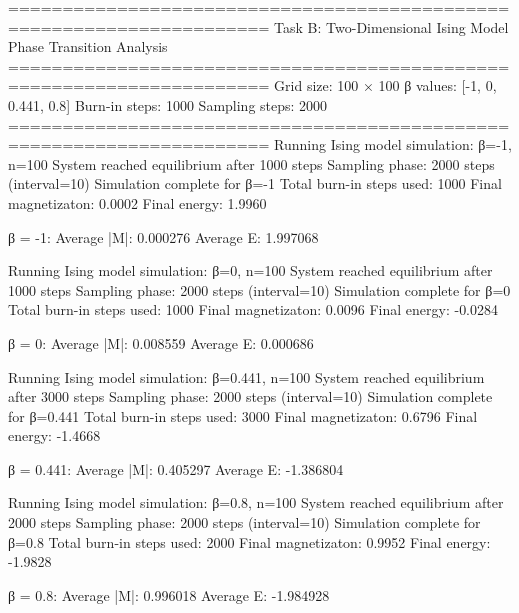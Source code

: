 \documentclass[11pt]{article}
\newenvironment{Shaded}{}{}
\newcommand{\NormalTok}[1]{{#1}}
\begin{document}
\begin{Shaded}
\begin{Highlighting}[]
\NormalTok{======================================================================}
\NormalTok{Task B: Two{-}Dimensional Ising Model Phase Transition Analysis}
\NormalTok{======================================================================}
\NormalTok{Grid size: 100 × 100}
\NormalTok{β values: [{-}1, 0, 0.441, 0.8]}
\NormalTok{Burn{-}in steps: 1000}
\NormalTok{Sampling steps: 2000}
\NormalTok{======================================================================}
\NormalTok{Running Ising model simulation: β={-}1, n=100}
\NormalTok{  System reached equilibrium after 1000 steps}
\NormalTok{  Sampling phase: 2000 steps (interval=10)}
\NormalTok{Simulation complete for β={-}1}
\NormalTok{  Total burn{-}in steps used: 1000}
\NormalTok{  Final magnetizaton: 0.0002}
\NormalTok{  Final energy: 1.9960}

\NormalTok{β = {-}1:}
\NormalTok{  Average |M|: 0.000276}
\NormalTok{  Average E:  1.997068}

\NormalTok{Running Ising model simulation: β=0, n=100}
\NormalTok{  System reached equilibrium after 1000 steps}
\NormalTok{  Sampling phase: 2000 steps (interval=10)}
\NormalTok{Simulation complete for β=0}
\NormalTok{  Total burn{-}in steps used: 1000}
\NormalTok{  Final magnetizaton: 0.0096}
\NormalTok{  Final energy: {-}0.0284}

\NormalTok{β = 0:}
\NormalTok{  Average |M|: 0.008559}
\NormalTok{  Average E:  0.000686}

\NormalTok{Running Ising model simulation: β=0.441, n=100}
\NormalTok{  System reached equilibrium after 3000 steps}
\NormalTok{  Sampling phase: 2000 steps (interval=10)}
\NormalTok{Simulation complete for β=0.441}
\NormalTok{  Total burn{-}in steps used: 3000}
\NormalTok{  Final magnetizaton: 0.6796}
\NormalTok{  Final energy: {-}1.4668}

\NormalTok{β = 0.441:}
\NormalTok{  Average |M|: 0.405297}
\NormalTok{  Average E:  {-}1.386804}

\NormalTok{Running Ising model simulation: β=0.8, n=100}
\NormalTok{  System reached equilibrium after 2000 steps}
\NormalTok{  Sampling phase: 2000 steps (interval=10)}
\NormalTok{Simulation complete for β=0.8}
\NormalTok{  Total burn{-}in steps used: 2000}
\NormalTok{  Final magnetizaton: 0.9952}
\NormalTok{  Final energy: {-}1.9828}

\NormalTok{β = 0.8:}
\NormalTok{  Average |M|: 0.996018}
\NormalTok{  Average E:  {-}1.984928}


\end{Highlighting}
\end{Shaded}
\end{document}
